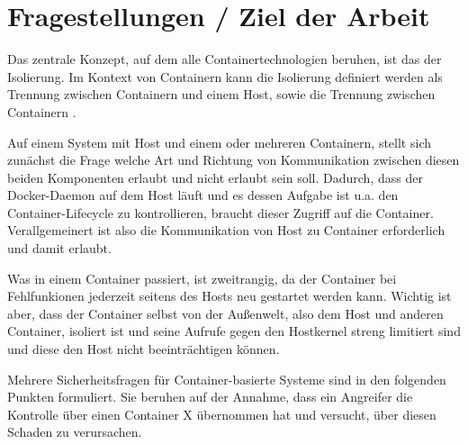\documentclass[../main.tex]{subfiles}
\begin{document}
\chapter{Fragestellungen / Ziel der Arbeit}
\label{question}




  Das zentrale Konzept, auf dem alle Containertechnologien beruhen, ist das der Isolierung. Im Kontext von Containern kann die Isolierung definiert werden als Trennung zwischen Containern und einem Host, sowie die Trennung zwischen Containern \cite[S.1]{dockerSec2}.

  Auf einem System mit Host und einem oder mehreren Containern, stellt sich zunächst die Frage welche Art und Richtung von Kommunikation zwischen diesen beiden Komponenten erlaubt und nicht erlaubt sein soll. Dadurch, dass der Docker-Daemon auf dem Host läuft und es dessen Aufgabe ist u.a. den Container-Lifecycle zu kontrollieren, braucht dieser Zugriff auf die Container. Verallgemeinert ist also die Kommunikation von Host zu Container erforderlich und damit erlaubt.

  Was in einem Container passiert, ist zweitrangig, da der Container bei Fehlfunkionen jederzeit seitens des Hosts neu gestartet werden kann. Wichtig ist aber, dass der Container selbst von der Außenwelt, also dem Host und anderen Container, isoliert ist und seine Aufrufe gegen den Hostkernel streng limitiert sind und diese den Host nicht beeinträchtigen können.

  Mehrere Sicherheitsfragen für Container-basierte Systeme sind in den folgenden Punkten formuliert. Sie beruhen auf der Annahme, dass ein Angreifer die Kontrolle über einen Container X übernommen hat und versucht, über diesen Schaden zu verursachen.
\end{document}
